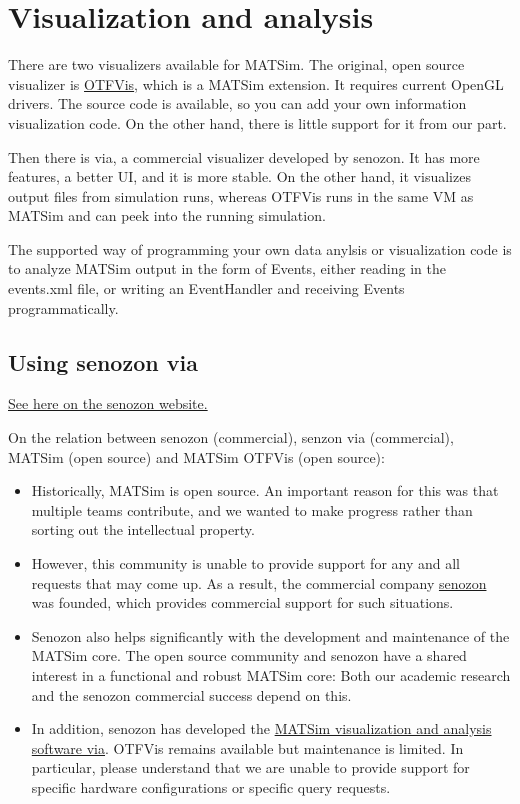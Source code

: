 \documentclass[a4paper,11pt]{report}
\begin{document}
\chapter{Visualization and analysis}

There are two visualizers available for MATSim. The original, open source visualizer is \href{http://matsim.org/docs/extensions/otfvis}{OTFVis},  which is a MATSim extension. It requires current OpenGL drivers. The  source code is available, so you can add your own information  visualization code. On the other hand, there is little support for it  from our part.

Then there is via, a commercial visualizer developed by senozon. It  has more features, a better UI, and it is more stable. On the other  hand, it visualizes output files from simulation runs, whereas OTFVis  runs in the same VM as MATSim and can peek into the running simulation.

The supported way of programming your own data anylsis or  visualization code is to analyze MATSim output in the form of Events,  either reading in the events.xml file, or writing an EventHandler and  receiving Events programmatically.

\vfill\eject
\section{Using senozon via}



\href{http://senozon.com/products/via}{See here on the senozon website.}



On the relation between senozon (commercial), senzon via (commercial), MATSim (open source) and MATSim OTFVis (open source):
\begin{itemize}
	\item Historically, MATSim is open source. An important reason  for this was that multiple teams contribute, and we wanted to make  progress rather than sorting out the intellectual property.
	\item However, this community is unable to provide support for any and all  requests that may come up. As a result, the commercial company \href{http://www.senzon.com/}{senozon} was founded, which provides commercial support for such situations.
	\item Senozon also helps significantly with the development and  maintenance of the MATSim core. The open source community and senozon  have a shared interest in a functional and robust MATSim core: Both our  academic research and the senozon commercial success depend on this.
	\item In addition, senozon has developed the \href{http://senozon.com/products/via}{MATSim visualization and analysis software via}.  OTFVis remains available but maintenance is limited. In  particular, please understand that we are unable to provide support for  specific hardware configurations or specific query requests.
\end{itemize}
\end{document}
